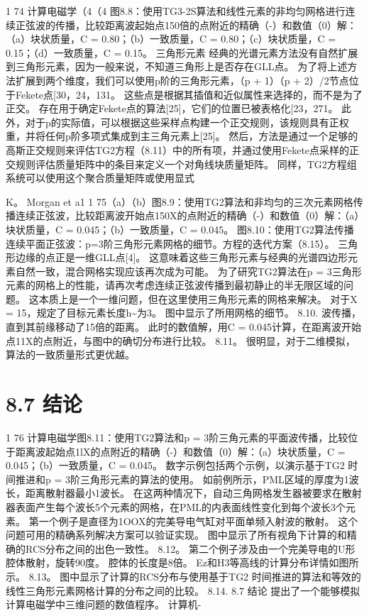 \documentclass[UTF8,11pt,a4paper,openany,fontset=fandol]{ctexbook}
\begin{document}
1 74 计算电磁学（4（4 图8.8：使用TG3-2S算法和线性元素的非均匀网格进行连续正弦波的传播，比较距离波起始点150倍的点附近的精确（-）和数值（0）解：（a）块状质量，C = 0.80；（b）一致质量，C = 0.80；（c）块状质量，C = 0.15；（d）一致质量，C = 0.15。 三角形元素 经典的光谱元素方法没有自然扩展到三角形元素，因为一般来说，不知道三角形上是否存在GLL点。 为了将上述方法扩展到两个维度，我们可以使用p阶的三角形元素，（p + 1）（p + 2）/2节点位于Fekete点[30，24，131。 这些点是根据其插值和近似属性来选择的，而不是为了正交。 存在用于确定Fekete点的算法[25]，它们的位置已被表格化[23，271。 此外，对于p的实际值，可以根据这些采样点构建一个正交规则，该规则具有正权重，并将任何p阶多项式集成到主三角元素上[25]。 然后，方法是通过一个足够的高斯正交规则来评估TG2方程（8.11）中的所有项，并通过使用Fekete点采样的正交规则评估质量矩阵中的条目来定义一个对角线块质量矩阵。 同样，TG2方程组系统可以使用这个聚合质量矩阵或使用显式

K。 Morgan et a1 1 75（a）（b）图8.9：使用TG2算法和非均匀的三次元素网格传播连续正弦波，比较距离波开始点150X的点附近的精确（-）和数值（0）解：（a）块状质量，C = 0.045；（b）一致质量，C = 0.045。 图8.10：使用TG2算法传播连续平面正弦波：p=3阶三角形元素网格的细节。方程的迭代方案（8.15）。 三角形边缘的点正是一维GLL点[4]。 这意味着这些三角形元素与经典的光谱四边形元素自然一致，混合网格实现应该再次成为可能。 为了研究TG2算法在p = 3三角形元素的网格上的性能，请再次考虑连续正弦波传播到最初静止的半无限区域的问题。 这本质上是一个一维问题，但在这里使用三角形元素的网格来解决。 对于X = 15，规定了目标元素长度h\textasciitilde{}为3。 图中显示了所用网格的细节。 8.10. 波传播，直到其前缘移动了15倍的距离。 此时的数值解，用C = 0.045计算，在距离波开始点11X的点附近，与图中的确切分布进行比较。 8.11。 很明显，对于二维模拟，算法的一致质量形式更优越。

\section{8.7 结论}
1 76 计算电磁学图8.11：使用TG2算法和p = 3阶三角元素的平面波传播，比较位于距离波起始点1lX的点附近的精确（-）和数值（0）解：（a）块状质量，C = 0.045；（b）一致质量，C = 0.045。 数字示例包括两个示例，以演示基于TG2 时间推进和p = 3阶三角形元素的算法的使用。 如前例所示，PML区域的厚度为1波长，距离散射器最小1波长。 在这两种情况下，自动三角网格发生器被要求在散射器表面产生每个波长5个元素的网格，在PML的内表面线性变化到每个波长3个元素。 第一个例子是直径为1OOX的完美导电气缸对平面单频入射波的散射。 这个问题可用的精确系列解决方案可以验证实现。 图中显示了所有视角下计算的和精确的RCS分布之间的出色一致性。 8.12。 第二个例子涉及由一个完美导电的U形腔体散射，旋转90度。 腔体的长度是8倍。 Ez和H3等高线的计算分布详情如图所示。 8.13。 图中显示了计算的RCS分布与使用基于TG2 时间推进的算法和等效的线性三角形元素网格计算的分布之间的比较。 8.14. 8.7 结论 提出了一个能够模拟计算电磁学中三维问题的数值程序。 计算机-
\end{document}
